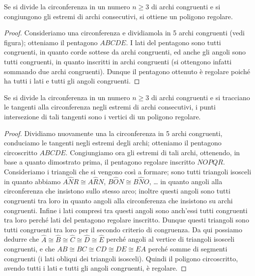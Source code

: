 \begin{teorema}
Se si divide la circonferenza in un numero $n\geq 3$ di archi congruenti e si congiungono gli estremi di archi consecutivi, si ottiene un poligono regolare.
\end{teorema}

\begin{figure}[!htb]
	\centering
\end{figure}

\begin{proof}
Consideriamo una circonferenza e dividiamola in 5 archi congruenti (vedi figura); otteniamo il pentagono $ABCDE$.
I lati del pentagono sono tutti congruenti, in quanto corde sottese da archi congruenti, ed anche gli angoli sono tutti congruenti, in quanto inscritti in archi congruenti (si ottengono infatti sommando due archi congruenti).
Dunque il pentagono ottenuto è regolare poiché ha tutti i lati e tutti gli angoli congruenti.
\end{proof}

\begin{teorema}
Se si divide la circonferenza in un numero $n\geq 3$ di archi congruenti e si tracciano le tangenti alla circonferenza negli  estremi di archi consecutivi, i punti intersezione di tali tangenti sono i vertici di un poligono regolare.
\end{teorema}

\begin{figure}[!htb]
	\centering
\end{figure}

\begin{proof}
Dividiamo nuovamente una la circonferenza in 5 archi congruenti, conduciamo le tangenti negli estremi degli archi; otteniamo il pentagono circoscritto $ABCDE$.
Congiungiamo ora gli estremi di tali archi, ottenendo, in base a quanto dimostrato prima, il pentagono regolare inscritto $NOPQR$. Consideriamo i triangoli che si vengono così a formare; sono tutti triangoli isosceli in quanto abbiamo $A\widehat{N}R\cong A\widehat{R}N$, $B\widehat{O}N\cong B\widehat{N}O$, \ldots{} in quanto angoli alla circonferenza che insistono sullo stesso arco; inoltre questi angoli sono tutti congruenti tra loro in quanto angoli alla circonferenza che insistono su archi congruenti. Infine i lati compresi tra questi angoli sono anch'essi tutti congruenti tra loro perché lati del pentagono regolare inscritto. Dunque questi triangoli sono tutti congruenti tra loro per il secondo criterio di congruenza. Da qui possiamo dedurre che $\widehat{A}\cong \widehat{B}\cong \widehat{C}\cong \widehat{D}\cong \widehat{E}$ perché angoli al vertice di triangoli isosceli congruenti, e che $AB\cong BC\cong CD\cong DE\cong EA$ perché somme di segmenti congruenti (i lati obliqui dei triangoli isosceli). Quindi il poligono circoscritto, avendo tutti i lati e tutti gli angoli congruenti, è regolare.
\end{proof}

